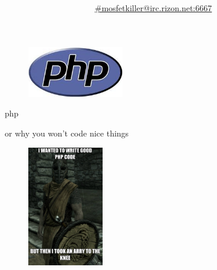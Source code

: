 \documentclass[final]{beamer}
\author{\href{http://chat.mibbit.com/?channel=\%23mosfetkiller\&nick=your_nick_here\&server=irc.rizon.net\&autoConnect=true}{\#mosfetkiller@irc.rizon.net:6667}}
\title{ }
\begin{document}
\begin{frame}
\begin{center}
\vspace{1em}
\vspace{0.4em}
\begin{figure}[ht]
  \centering
	\includegraphics[width=160px]{./../graph/other/php.jpg}
\end{figure}
\vspace{0.4em}
\vspace{1em}
\end{center}
\end{frame}

\begin{frame}{php}
\begin{center}
\vspace{1em}
\vspace{0.4em}
\centering or why you won't code nice things
\vspace{0.4em}
\vspace{1em}
\end{center}
\end{frame}

\begin{frame}
\begin{center}
\begin{figure}[ht]
  \centering
	\includegraphics[height=200px]{./../graph/Meme/arraytotheknee.jpg}
\end{figure}
\end{center}
\end{frame}
\end{document}
